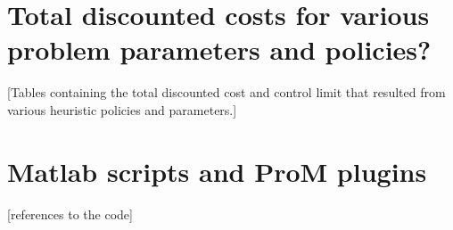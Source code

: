 \documentclass[a4paper]{thesis}
\theoremstyle{definition}
\begin{document}
\begin{appendices}
\chapter{Total discounted costs for various problem parameters and policies?}\label{AppendixComputationsTable}
[Tables containing the total discounted cost and control limit that resulted from various heuristic policies and parameters.]
\chapter{Matlab scripts and ProM plugins}
[references to the code]
\end{appendices}
\end{document}
